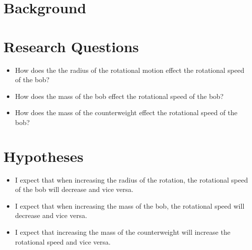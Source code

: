 \documentclass{lab}
\begin{document}
     \insertTitlePage

    \section{Background}
	\section{Research Questions}
        \begin{itemize}
                \vspace{-0.2cm}
                \itemsep-3pt
                \item How does the the radius of the rotational motion effect the rotational speed of the bob?
                \item How does the mass of the bob effect the rotational speed of the bob?
                \item How does the mass of the counterweight effect the rotational speed of the bob?
        \end{itemize}
	
	\section{Hypotheses}
        \begin{itemize}
                \vspace{-0.2cm}
                \itemsep-3pt
                \item I expect that when increasing the radius of the rotation, the rotational speed of the bob will decrease and vice versa.
                \item I expect that when increasing the mass of the bob, the rotational speed will decrease and vice versa.
				\item I expect that increasing the mass of the counterweight will increase the rotational speed and vice versa.
        \end{itemize}
\end{document}
